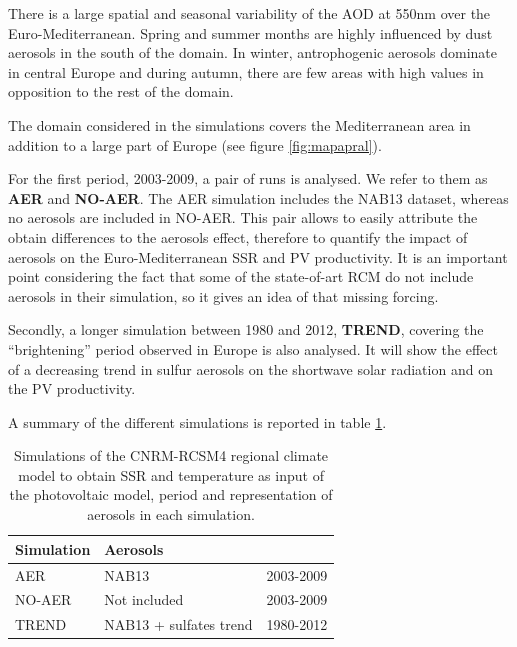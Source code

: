 There is a large spatial and seasonal variability of the AOD at 550nm over the Euro-Mediterranean. Spring and summer months are highly influenced by dust aerosols in the south of the domain. In winter, antrophogenic aerosols dominate in central Europe and during autumn, there are few areas with high values in opposition to the rest of the domain.

The domain considered in the simulations covers the Mediterranean area in addition to a large part of Europe (see figure \ref{fig:mapapral}).

For the first period, 2003-2009, a pair of runs is analysed. We refer to them as \textbf{AER} and \textbf{NO-AER}. The AER simulation includes the NAB13 dataset, whereas no aerosols are included in NO-AER. This pair allows to easily attribute the obtain differences to the aerosols effect, therefore to quantify the impact of aerosols on the Euro-Mediterranean SSR and PV productivity. It is an important point considering the fact that some of the state-of-art RCM do not include aerosols in their simulation, so it gives an idea of that missing forcing.

Secondly, a longer simulation between 1980 and 2012, \textbf{TREND}, covering the ``brightening'' period observed in Europe is also analysed. It will show the effect of a decreasing trend in sulfur aerosols on the shortwave solar radiation and on the PV productivity.  

A summary of the different simulations is reported in table \ref{tabSIM}.

\begin{table}
  \begin{tabular}{>{\raggedright}m{2cm}>{\raggedright}m{3cm}>{\raggedright}m{2cm}}
    \toprule 
    Simulation & Aerosols & \centering{Period}\tabularnewline
    \midrule
    AER & NAB13 & 2003-2009
    \tabularnewline
    \midrule
    NO-AER & Not included & 2003-2009
   \tabularnewline
   \midrule           
  TREND & NAB13 + sulfates trend & 1980-2012
   \tabularnewline
    \bottomrule
  \end{tabular}
  \caption{Simulations of the CNRM-RCSM4 regional climate model to obtain SSR and temperature as input of the photovoltaic model, period and representation of aerosols in each simulation.}
\label{tabSIM}
\end{table}

